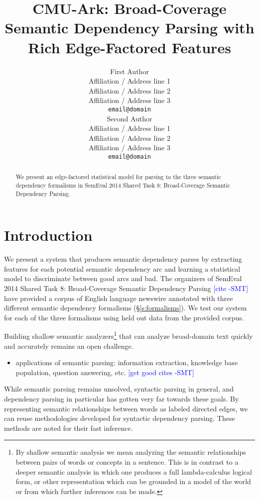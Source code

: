 \documentclass[11pt]{article}
\title{CMU-Ark: Broad-Coverage Semantic Dependency Parsing with Rich
Edge-Factored Features \sam{better title, please}}
\author{First Author \\
  Affiliation / Address line 1 \\
  Affiliation / Address line 2 \\
  Affiliation / Address line 3 \\
  {\tt email@domain} \\\And
  Second Author \\
  Affiliation / Address line 1 \\
  Affiliation / Address line 2 \\
  Affiliation / Address line 3 \\
  {\tt email@domain} \\}
\date{}
\newcommand{\sam}[1]{\textcolor{blue}{[#1 -SMT]}}
\begin{document}
\maketitle

\begin{abstract}
We present an edge-factored statistical model for parsing to the three semantic
dependency formalisms in SemEval 2014 Shared Task 8: Broad-Coverage Semantic
Dependency Parsing.

\end{abstract}



\section{Introduction}

We present a system that produces semantic dependency parses by extracting
features for each potential semantic dependency arc and learning a statistical
model to discriminate between good arcs and bad.
The organizers of SemEval 2014 Shared Task 8: Broad-Coverage Semantic Dependency
Parsing \sam{cite} have provided a corpus of English language newswire
annotated with three different semantic dependency formalisms
(\S\ref{s:formalisms}).
We test our system for each of the three formalisms using held out data
from the provided corpus.

Building shallow semantic analyzers\footnote{By shallow semantic analysis we
mean analyzing the semantic relationships between pairs of words or concepts in
a sentence.
This is in contrast to a deeper semantic analysis in which one produces a full
lambda-calculus logical form, or other representation which can be grounded in a
model of the world or from which further inferences can be made.
}
that can analyze broad-domain text quickly
and accurately remains an open challenge.
\begin{itemize}
\item applications of semantic parsing: information extraction, knowledge base
population, question answering, etc. \sam{get good cites}
\end{itemize}
While semantic parsing remains unsolved, syntactic parsing in general, and
dependency parsing in particular has gotten very far towards these goals.
By representing semantic relationships between words as labeled
directed edges, we can reuse methodologies developed for syntactic dependency
parsing.
These methods are noted for their fast inference.
\end{document}
